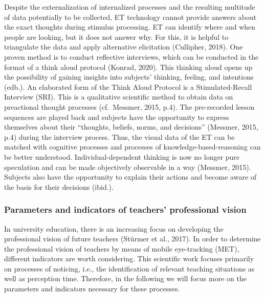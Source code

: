 \documentclass[
  man]{apa6}
\begin{document}
Despite the externalization of internalized processes and the resulting multitude of data potentially to be collected, ET technology cannot provide answers about the exact thoughts during stimulus processing. ET can identify where and when people are looking, but it does not answer why. For this, it is helpful to triangulate the data and apply alternative elicitation (Cullipher, 2018). One proven method is to conduct reflective interviews, which can be conducted in the format of a think aloud protocol (Konrad, 2020). This thinking aloud opens up the possibility of gaining insights into subjects' thinking, feeling, and intentions (edb.). An elaborated form of the Think Aloud Protocol is a Stimulated-Recall Interview (SRI). This is a qualitative scientific method to obtain data on preactional thought processes (cf.~Messmer, 2015, p.4). The pre-recorded lesson sequences are played back and subjects have the opportunity to express themselves about their ``thoughts, beliefs, norms, and decisions'' (Messmer, 2015, p.4) during the interview process. Thus, the visual data of the ET can be matched with cognitive processes and processes of knowledge-based-reasoning can be better understood. Individual-dependent thinking is now no longer pure speculation and can be made objectively observable in a way (Messmer, 2015). Subjects also have the opportunity to explain their actions and become aware of the basis for their decisions (ibid.).

\subsubsection{Parameters and indicators of teachers' professional vision}\label{parameters-and-indicators-of-teachers-professional-vision}

In university education, there is an increasing focus on developing the professional vision of future teachers (Stürmer et al., 2017). In order to determine the professional vision of teachers by means of mobile eye-tracking (MET), different indicators are worth considering. This scientific work focuses primarily on processes of noticing, i.e., the identification of relevant teaching situations as well as perception time. Therefore, in the following we will focus more on the parameters and indicators necessary for these processes.
\end{document}
